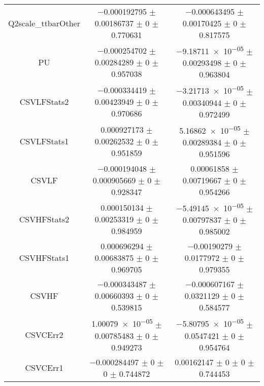 \begin{table}
\begin{tabular}{ccc}
Q2scale\_ttbarOther & \num{-0.000192795} $\pm$ \num{0.00186737} $\pm$ \num{0} $\pm$ \num{0.770631} & \num{-0.000643495} $\pm$ \num{0.00170425} $\pm$ \num{0} $\pm$ \num{0.817575}\\
PU & \num{-0.000254702} $\pm$ \num{0.00284289} $\pm$ \num{0} $\pm$ \num{0.957038} & \num{-9.18711e-05} $\pm$ \num{0.00293498} $\pm$ \num{0} $\pm$ \num{0.963804}\\
CSVLFStats2 & \num{-0.000334419} $\pm$ \num{0.00423949} $\pm$ \num{0} $\pm$ \num{0.970686} & \num{-3.21713e-05} $\pm$ \num{0.00340944} $\pm$ \num{0} $\pm$ \num{0.972499}\\
CSVLFStats1 & \num{0.000927173} $\pm$ \num{0.00262532} $\pm$ \num{0} $\pm$ \num{0.951859} & \num{5.16862e-05} $\pm$ \num{0.00289384} $\pm$ \num{0} $\pm$ \num{0.951596}\\
CSVLF & \num{-0.000194048} $\pm$ \num{0.000905669} $\pm$ \num{0} $\pm$ \num{0.928347} & \num{0.00061858} $\pm$ \num{0.00719667} $\pm$ \num{0} $\pm$ \num{0.954266}\\
CSVHFStats2 & \num{0.000150134} $\pm$ \num{0.00253319} $\pm$ \num{0} $\pm$ \num{0.984959} & \num{-5.49145e-05} $\pm$ \num{0.00797837} $\pm$ \num{0} $\pm$ \num{0.985002}\\
CSVHFStats1 & \num{0.000696294} $\pm$ \num{0.00683875} $\pm$ \num{0} $\pm$ \num{0.969705} & \num{-0.00190279} $\pm$ \num{0.0177972} $\pm$ \num{0} $\pm$ \num{0.979355}\\
CSVHF & \num{-0.000343487} $\pm$ \num{0.00660393} $\pm$ \num{0} $\pm$ \num{0.539815} & \num{-0.000607167} $\pm$ \num{0.0321129} $\pm$ \num{0} $\pm$ \num{0.584577}\\
CSVCErr2 & \num{1.00079e-05} $\pm$ \num{0.00785483} $\pm$ \num{0} $\pm$ \num{0.949273} & \num{-5.80795e-05} $\pm$ \num{0.0547421} $\pm$ \num{0} $\pm$ \num{0.954764}\\
CSVCErr1 & \num{-0.000284497} $\pm$ \num{0} $\pm$ \num{0} $\pm$ \num{0.744872} & \num{0.00162147} $\pm$ \num{0} $\pm$ \num{0} $\pm$ \num{0.744453}\\
\bottomrule
\end{tabular}
\end{table}